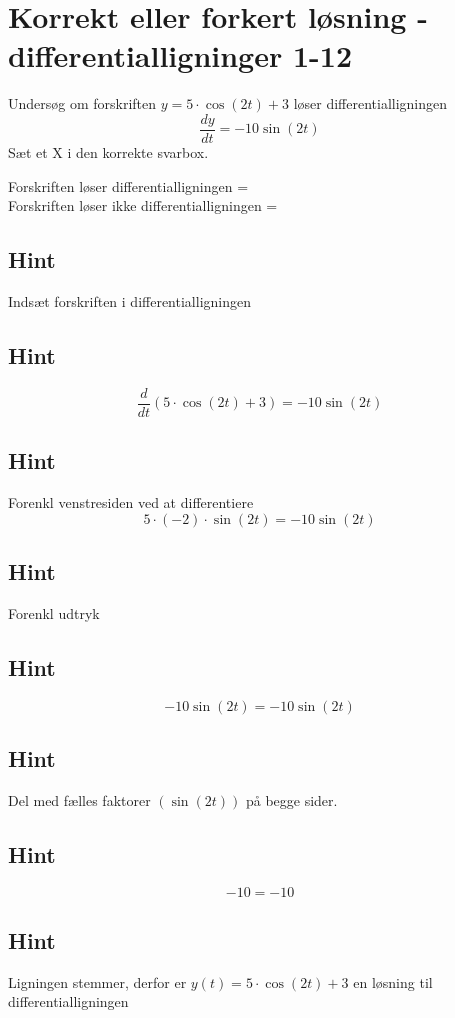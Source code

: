\documentclass{article}
\newenvironment{exercise}[1]{\newpage\section{#1}}{}
\newcommand{\answerbox}[1]{\fbox{$#1$}}
\newcommand{\hint}{\subsection*{Hint}}
\begin{document}
\begin{exercise}{Korrekt eller forkert løsning - differentialligninger 1-12}
	
	
	Undersøg om forskriften $y = 5 \cdot \cos(2t) + 3$ løser differentialligningen
	\[
	\frac{dy}{dt} = -10 \sin(2t)
	\]
	Sæt et X i den korrekte svarbox.
	
	Forskriften løser differentialligningen = \answerbox{X} \\
	
	Forskriften løser ikke differentialligningen = \answerbox{}
	
	\hint
	
	Indsæt forskriften i differentialligningen
	
	\hint
	\[
	\frac{d}{dt} \left(5 \cdot \cos(2t) + 3\right) = -10 \sin(2t)
	\]
	
	
	\hint
	
	Forenkl venstresiden ved at differentiere
	\[
	5 \cdot (-2) \cdot \sin(2t) = -10 \sin(2t)
	\]
	
	\hint
	
	Forenkl udtryk
	
	\hint
	\[
	-10 \sin(2t) = -10 \sin(2t)
	\]
	
	\hint
	Del med fælles faktorer $\left(  \sin(2t) \right)$ på begge sider.
	
	\hint
	
	\[
	-10 = -10
	\]
	
	
	\hint
	
	Ligningen stemmer, derfor er $y(t) = 5 \cdot \cos(2t) + 3$ en løsning til differentialligningen
	
\end{exercise}
\end{document}
